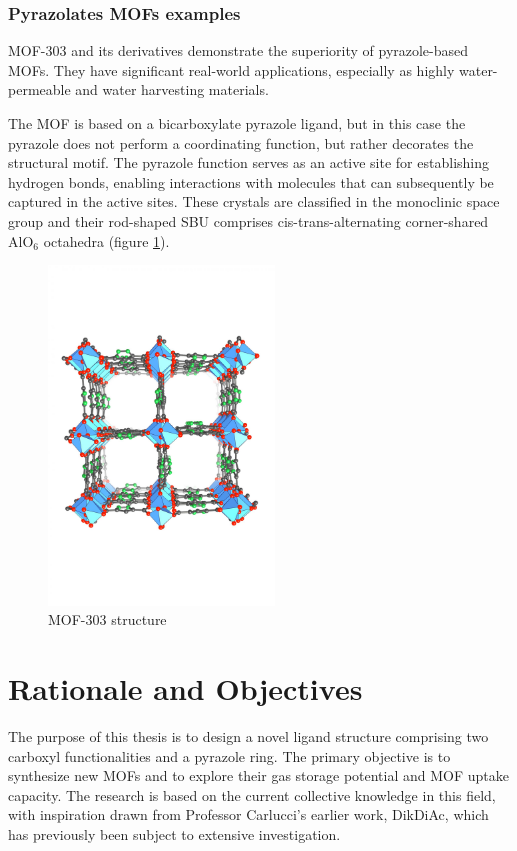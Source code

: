 \documentclass[../Master.tex]{subfiles}
\begin{document}
\subsubsection{Pyrazolates MOFs examples}

MOF-303 and its derivatives demonstrate the superiority of pyrazole-based MOFs. They have significant real-world applications, especially as highly water-permeable\cite{cong_highly_2021} and water harvesting\cite{zheng_broadly_2022} materials.

The MOF is based on a bicarboxylate pyrazole ligand, but in this case the pyrazole does not perform a coordinating function, but rather decorates the structural motif. The pyrazole function serves as an active site for establishing hydrogen bonds, enabling interactions with molecules that can subsequently be captured in the active sites. These crystals are classified in the monoclinic space group and their rod-shaped SBU comprises cis-trans-alternating corner-shared AlO$_{6}$ octahedra (figure \ref{fig:mof303structure}).

\begin{figure}[h!]
	\centering
	\includegraphics[width=6cm,keepaspectratio]{Images/MOF303.jpeg}
	\caption{MOF-303 structure}\label{fig:mof303structure}
\end{figure}

\section{Rationale and Objectives}\label{sec:rat-obj}

The purpose of this thesis is to design a novel ligand structure comprising two carboxyl functionalities and a pyrazole ring. The primary objective is to synthesize new MOFs and to explore their gas storage potential and MOF uptake capacity. The research is based on the current collective knowledge in this field, with inspiration drawn from Professor Carlucci's earlier work, DikDiAc, which has previously been subject to extensive investigation.
\end{document}
